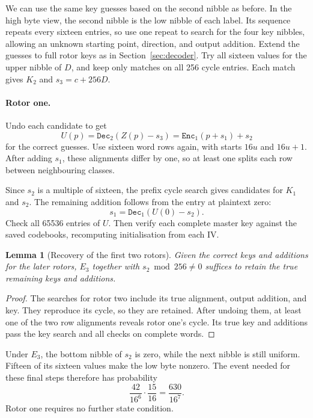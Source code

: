 \documentclass[11pt]{article}
\newtheorem{lemma}[theorem]{Lemma}
\begin{document}
We can use the same key guesses based on the second nibble as before.
In the high byte view, the second nibble is the low nibble of each
label. Its sequence repeats every sixteen entries, so use one repeat
to search for the four key nibbles, allowing an unknown starting
point, direction, and output addition. Extend the guesses to full
rotor keys as in Section~\ref{sec:decoder}. Try all sixteen values
for the upper nibble of \(D\), and keep only matches on all 256 cycle
entries. Each match gives \(K_2\) and \(s_3=c+256D\).

\paragraph{Rotor one.}
Undo each candidate to get
\[
 U(p)=\mathtt{Dec}_2(Z(p)-s_3)
     =\mathtt{Enc}_1(p+s_1)+s_2
\]
for the correct guesses. Use sixteen word rows again, with starts
\(16u\) and \(16u+1\). After adding \(s_1\), these alignments differ
by one, so at least one splits each row between neighbouring classes.

Since \(s_2\) is a multiple of sixteen, the prefix cycle search gives
candidates for \(K_1\) and \(s_2\). The remaining addition follows from
the entry at plaintext zero:
\[
 s_1=\mathtt{Dec}_1(U(0)-s_2).
\]
Check all 65536 entries of \(U\). Then verify each complete master key
against the saved codebooks, recomputing initialisation from each IV.

\begin{lemma}[Recovery of the first two rotors]\label{lem:tail}
Given the correct keys and additions for the later rotors, \(E_3\)
together with \(s_2\bmod256\ne0\) suffices to retain the true remaining
keys and additions.
\end{lemma}
\begin{proof}
The searches for rotor two include its true alignment, output
addition, and key. They reproduce its cycle, so they are retained.
After undoing them, at least one of the two row alignments reveals
rotor one's cycle. Its true key and additions pass the key search
and all checks on complete words.
\end{proof}

Under \(E_3\), the bottom nibble of \(s_2\) is zero, while the next
nibble is still uniform. Fifteen of its sixteen values make the
low byte nonzero. The event needed for these final steps therefore has
probability
\[
 \frac{42}{16^6}\cdot\frac{15}{16}=\frac{630}{16^7}.
\]
Rotor one requires no further state condition.
\end{document}
